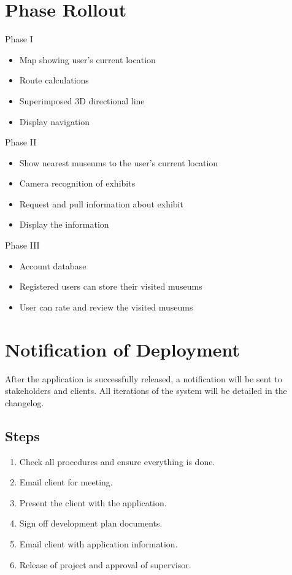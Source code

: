 \documentclass[12pt]{article}
\begin{document}
\section{Phase Rollout}
Phase I
\begin{itemize}
    \item Map showing user's current location
    \item Route calculations
    \item Superimposed 3D directional line
    \item Display navigation
\end{itemize}
Phase II
\begin{itemize}
    \item Show nearest museums to the user's current location
    \item Camera recognition of exhibits
    \item Request and pull information about exhibit
    \item Display the information
\end{itemize}
Phase III
\begin{itemize}
    \item Account database
    \item Registered users can store their visited museums
    \item User can rate and review the visited museums
\end{itemize}

\section{Notification of Deployment}
After the application is successfully released, a notification will be sent to stakeholders and clients. All iterations of the system will be detailed in the changelog.

\subsection{Steps}
\begin{enumerate}
    \item Check all procedures and ensure everything is done.
    \item Email client for meeting.
    \item Present the client with the application.
    \item Sign off development plan documents.
    \item Email client with application information.
    \item Release of project and approval of supervisor.
\end{enumerate}
\end{document}
